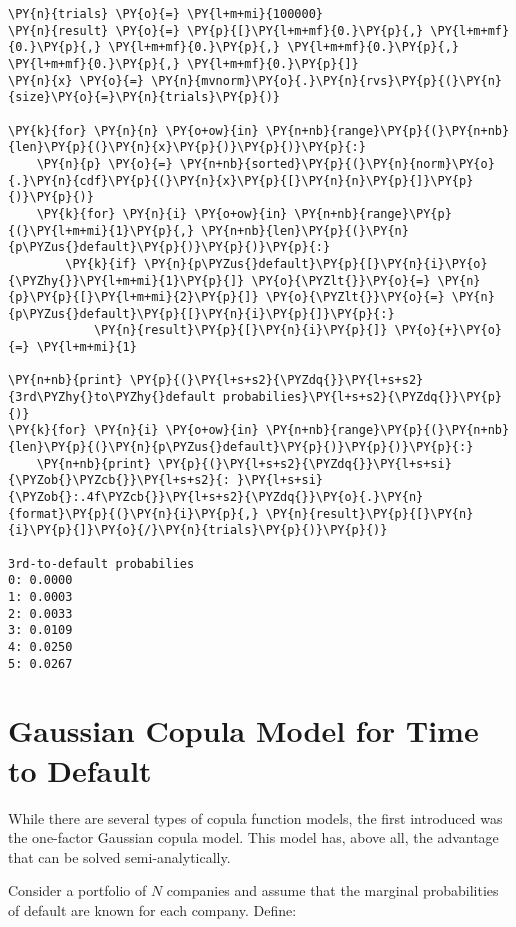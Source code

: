 \begin{tcolorbox}[breakable, size=fbox, boxrule=1pt, pad at break*=1mm,colback=cellbackground, colframe=cellborder]
\begin{Verbatim}[commandchars=\\\{\}]
\PY{n}{trials} \PY{o}{=} \PY{l+m+mi}{100000}
\PY{n}{result} \PY{o}{=} \PY{p}{[}\PY{l+m+mf}{0.}\PY{p}{,} \PY{l+m+mf}{0.}\PY{p}{,} \PY{l+m+mf}{0.}\PY{p}{,} \PY{l+m+mf}{0.}\PY{p}{,} \PY{l+m+mf}{0.}\PY{p}{,} \PY{l+m+mf}{0.}\PY{p}{]}
\PY{n}{x} \PY{o}{=} \PY{n}{mvnorm}\PY{o}{.}\PY{n}{rvs}\PY{p}{(}\PY{n}{size}\PY{o}{=}\PY{n}{trials}\PY{p}{)}
	
\PY{k}{for} \PY{n}{n} \PY{o+ow}{in} \PY{n+nb}{range}\PY{p}{(}\PY{n+nb}{len}\PY{p}{(}\PY{n}{x}\PY{p}{)}\PY{p}{)}\PY{p}{:}
    \PY{n}{p} \PY{o}{=} \PY{n+nb}{sorted}\PY{p}{(}\PY{n}{norm}\PY{o}{.}\PY{n}{cdf}\PY{p}{(}\PY{n}{x}\PY{p}{[}\PY{n}{n}\PY{p}{]}\PY{p}{)}\PY{p}{)}
    \PY{k}{for} \PY{n}{i} \PY{o+ow}{in} \PY{n+nb}{range}\PY{p}{(}\PY{l+m+mi}{1}\PY{p}{,} \PY{n+nb}{len}\PY{p}{(}\PY{n}{p\PYZus{}default}\PY{p}{)}\PY{p}{)}\PY{p}{:}
        \PY{k}{if} \PY{n}{p\PYZus{}default}\PY{p}{[}\PY{n}{i}\PY{o}{\PYZhy{}}\PY{l+m+mi}{1}\PY{p}{]} \PY{o}{\PYZlt{}}\PY{o}{=} \PY{n}{p}\PY{p}{[}\PY{l+m+mi}{2}\PY{p}{]} \PY{o}{\PYZlt{}}\PY{o}{=} \PY{n}{p\PYZus{}default}\PY{p}{[}\PY{n}{i}\PY{p}{]}\PY{p}{:}
            \PY{n}{result}\PY{p}{[}\PY{n}{i}\PY{p}{]} \PY{o}{+}\PY{o}{=} \PY{l+m+mi}{1}
	
\PY{n+nb}{print} \PY{p}{(}\PY{l+s+s2}{\PYZdq{}}\PY{l+s+s2}{3rd\PYZhy{}to\PYZhy{}default probabilies}\PY{l+s+s2}{\PYZdq{}}\PY{p}{)}
\PY{k}{for} \PY{n}{i} \PY{o+ow}{in} \PY{n+nb}{range}\PY{p}{(}\PY{n+nb}{len}\PY{p}{(}\PY{n}{p\PYZus{}default}\PY{p}{)}\PY{p}{)}\PY{p}{:}
    \PY{n+nb}{print} \PY{p}{(}\PY{l+s+s2}{\PYZdq{}}\PY{l+s+si}{\PYZob{}\PYZcb{}}\PY{l+s+s2}{: }\PY{l+s+si}{\PYZob{}:.4f\PYZcb{}}\PY{l+s+s2}{\PYZdq{}}\PY{o}{.}\PY{n}{format}\PY{p}{(}\PY{n}{i}\PY{p}{,} \PY{n}{result}\PY{p}{[}\PY{n}{i}\PY{p}{]}\PY{o}{/}\PY{n}{trials}\PY{p}{)}\PY{p}{)}

3rd-to-default probabilies
0: 0.0000
1: 0.0003
2: 0.0033
3: 0.0109
4: 0.0250
5: 0.0267
\end{Verbatim}
\end{tcolorbox}

\section{Gaussian Copula Model for Time to Default}\label{standard-market-model}
While there are several types of copula function models, the first
introduced was the one-factor Gaussian copula model. This model has,
above all, the advantage that can be solved semi-analytically.

Consider a portfolio of \(N\) companies and assume that the marginal
probabilities of default are known for each company. Define:

